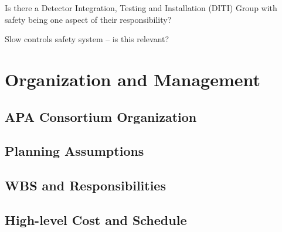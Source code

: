 Is there a Detector Integration, Testing and Installation (DITI) Group with safety being one aspect of their responsibility?

Slow controls safety system -- is this relevant?






\section{Organization and Management}
\label{sec:fdsp-apa-org}

\subsection{APA Consortium Organization}
\label{sec:fdsp-apa-org-consortium}


\subsection{Planning Assumptions}
\label{sec:fdsp-apa-org-assmp}


\subsection{WBS and Responsibilities}
\label{sec:fdsp-apa-org-wbs}

\subsection{High-level Cost and Schedule}
\label{sec:fdsp-apa-org-cs}

















